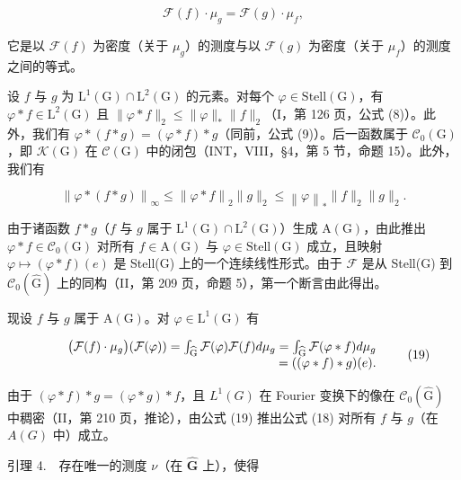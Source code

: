 \[
\mathcal {F} (f) \cdot \mu_ {g} = \mathcal {F} (g) \cdot \mu_ {f},\tag{18}
\]

它是以 \(\mathcal{F}(f)\) 为密度（关于 \(\mu_g\)）的测度与以 \(\mathcal{F}(g)\) 为密度（关于 \(\mu_f\)）的测度之间的等式。

设 \(f\) 与 \(g\) 为 \(\mathrm{L}^{1}(\mathrm{G}) \cap \mathrm{L}^{2}(\mathrm{G})\) 的元素。对每个 \(\varphi \in \mathrm{Stell}(\mathrm{G})\)，有 \(\varphi * f \in \mathrm{L}^{2}(\mathrm{G})\) 且 \(\| \varphi * f \|_{2} \leqslant \| \varphi \|_{*} \| f \|_{2}\)（I，第 126 页，公式 (8)）。此外，我们有 \(\varphi * (f * g) = (\varphi * f) * g\)（同前，公式 (9)）。后一函数属于 \(\mathcal{C}_{0}(\mathrm{G})\)，即 \(\mathcal{K}(\mathrm{G})\) 在 \(\mathcal{C}(\mathrm{G})\) 中的闭包（INT，VIII，§4，第 5 节，命题 15）。此外，我们有

\[
\left\| \varphi * (f * g) \right\| _ {\infty} \leqslant \left\| \varphi * f \right\| _ {2} \| g \| _ {2} \leqslant \left\| \varphi \right\| _ {*} \| f \| _ {2} \| g \| _ {2}.
\]

由于诸函数 \(f * g\)（\(f\) 与 \(g\) 属于 \(\mathrm{L}^1(\mathrm{G}) \cap \mathrm{L}^2(\mathrm{G})\)）生成 \(\mathrm{A}(\mathrm{G})\)，由此推出 \(\varphi * f \in \mathcal{C}_0(\mathrm{G})\) 对所有 \(f \in \mathrm{A}(\mathrm{G})\) 与 \(\varphi \in \mathrm{Stell}(\mathrm{G})\) 成立，且映射 \(\varphi \mapsto (\varphi * f)(e)\) 是 Stell(G) 上的一个连续线性形式。由于 \(\mathcal{F}\) 是从 Stell(G) 到 \(\mathcal{C}_{0}(\widehat{\mathrm{G}})\) 上的同构（II，第 209 页，命题 5），第一个断言由此得出。

现设 \(f\) 与 \(g\) 属于 \(\mathrm{A}(\mathrm{G})\)。对 \(\varphi \in \mathrm{L}^1 (\mathrm{G})\) 有

\[
\begin{array}{r l r} & & {\big (\mathcal {F} (f) \cdot \mu_ {g} \big) (\mathcal {F} (\varphi)) = \int_ {\widehat {\mathrm{G}}} \mathcal {F} (\varphi) \mathcal {F} (f) d \mu_ {g} = \int_ {\widehat {\mathrm{G}}} \mathcal {F} (\varphi * f) d \mu_ {g}} \\ & & {= ((\varphi * f) * g) (e).} \end{array}\tag{19}
\]

由于 \((\varphi*f)*g=(\varphi*g)*f\)，且 \(L^{1}(G)\) 在 Fourier 变换下的像在 \(\mathcal{C}_{0}(\widehat{\mathrm{G}})\) 中稠密（II，第 210 页，推论），由公式 (19) 推出公式 (18) 对所有 \(f\) 与 \(g\)（在 \(A(G)\) 中）成立。

引理 4.　存在唯一的测度 \(\nu\)（在 \(\widehat{\mathbf{G}}\) 上），使得

